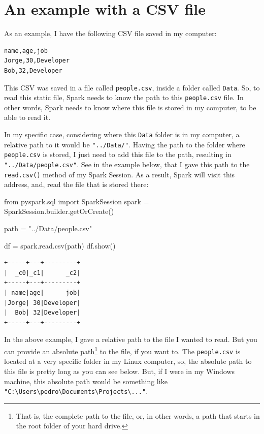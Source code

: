 \documentclass[
  11pt,
  letterpaper,
  DIV=11,
  numbers=noendperiod]{scrreprt}
\newenvironment{Shaded}{\begin{snugshade}}{\end{snugshade}}
\newcommand{\ImportTok}[1]{\textcolor[rgb]{0.00,0.46,0.62}{#1}}
\newcommand{\NormalTok}[1]{\textcolor[rgb]{0.00,0.23,0.31}{#1}}
\newcommand{\OperatorTok}[1]{\textcolor[rgb]{0.37,0.37,0.37}{#1}}
\newcommand{\StringTok}[1]{\textcolor[rgb]{0.13,0.47,0.30}{#1}}
\begin{document}
\hypertarget{an-example-with-a-csv-file}{%
\section{An example with a CSV file}\label{an-example-with-a-csv-file}}

As an example, I have the following CSV file saved in my computer:

\begin{verbatim}
name,age,job
Jorge,30,Developer
Bob,32,Developer
\end{verbatim}

This CSV was saved in a file called \texttt{people.csv}, inside a folder
called \texttt{Data}. So, to read this static file, Spark needs to know
the path to this \texttt{people.csv} file. In other words, Spark needs
to know where this file is stored in my computer, to be able to read it.

In my specific case, considering where this \texttt{Data} folder is in
my computer, a relative path to it would be \texttt{"../Data/"}. Having
the path to the folder where \texttt{people.csv} is stored, I just need
to add this file to the path, resulting in
\texttt{"../Data/people.csv"}. See in the example below, that I gave
this path to the \texttt{read.csv()} method of my Spark Session. As a
result, Spark will visit this address, and, read the file that is stored
there:

\begin{Shaded}
\begin{Highlighting}[]
\ImportTok{from}\NormalTok{ pyspark.sql }\ImportTok{import}\NormalTok{ SparkSession}
\NormalTok{spark }\OperatorTok{=}\NormalTok{ SparkSession.builder.getOrCreate()}

\NormalTok{path }\OperatorTok{=} \StringTok{"../Data/people.csv"}

\NormalTok{df }\OperatorTok{=}\NormalTok{ spark.read.csv(path)}
\NormalTok{df.show()}
\end{Highlighting}
\end{Shaded}

\begin{verbatim}
+-----+---+---------+
|  _c0|_c1|      _c2|
+-----+---+---------+
| name|age|      job|
|Jorge| 30|Developer|
|  Bob| 32|Developer|
+-----+---+---------+
\end{verbatim}

In the above example, I gave a relative path to the file I wanted to
read. But you can provide an absolute path\footnote{That is, the
  complete path to the file, or, in other words, a path that starts in
  the root folder of your hard drive.} to the file, if you want to. The
\texttt{people.csv} is located at a very specific folder in my Linux
computer, so, the absolute path to this file is pretty long as you can
see below. But, if I were in my Windows machine, this absolute path
would be something like
\texttt{"C:\textbackslash{}Users\textbackslash{}pedro\textbackslash{}Documents\textbackslash{}Projects\textbackslash{}..."}.
\end{document}
